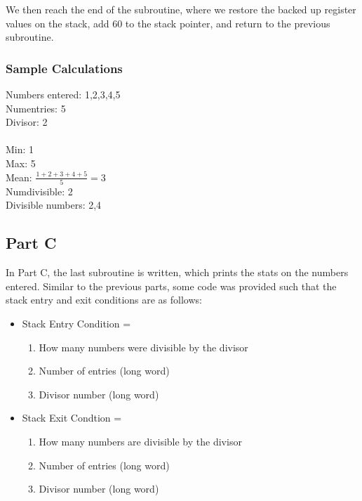 \documentclass[letterpaper]{article}
\begin{document}
    We then reach the end of the subroutine, where we restore the backed up register values
    on the stack, add 60 to the stack pointer, and return to the previous subroutine.


    \subsubsection{Sample Calculations}
    Numbers entered: 1,2,3,4,5\\
    Numentries: 5\\
    Divisor: 2\\ \\
    Min: 1\\
    Max: 5\\
    Mean: $\frac{1+2+3+4+5}{5}=3$\\
    Numdivisible: 2\\
    Divisible numbers: 2,4


    \subsection{Part C}

    In Part C, the last subroutine is written, which prints the stats
    on the numbers entered. Similar to the previous parts, some code was provided
    such that the stack entry and exit conditions are as follows:

    \begin{itemize}
      \item Stack Entry Condition =
        \begin{enumerate}
          \item How many numbers were divisible by the divisor
          \item Number of entries (long word)
          \item Divisor number (long word)
        \end{enumerate}
      \item Stack Exit Condtion =
        \begin{enumerate}
          \item How many numbers are divisible by the divisor
          \item Number of entries (long word)
          \item Divisor number (long word)
        \end{enumerate}
    \end{itemize}
\end{document}
